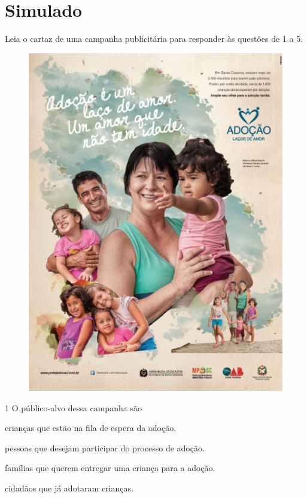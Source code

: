 \setcounter{chapter}{0}
\chapter[Simulado 1]{Simulado}

Leia o cartaz de uma campanha publicitária para responder às questões de
1 a 5.


\begin{figure}[htpb!]
\centering
\includegraphics[width=.65\textwidth]{./_SAEB_9_POR/media/image33.jpeg}
\end{figure}


\num{1} O público-alvo dessa campanha são

\begin{escolha}
\item
  crianças que estão na fila de espera da adoção.
\item
  pessoas que desejam participar do processo de adoção.
\item
  famílias que querem entregar uma criança para a adoção.
\item
  cidadãos que já adotaram crianças.
\end{escolha}

